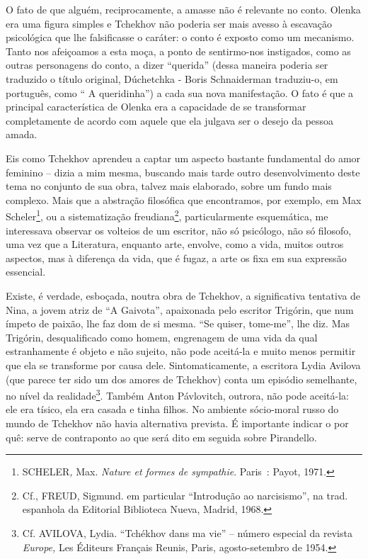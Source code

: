 O fato de que alguém, reciprocamente, a amasse não é relevante no conto.
Olenka era uma figura simples e Tchekhov não poderia ser mais avesso à
escavação psicológica que lhe falsificasse o caráter: o conto é exposto
como um mecanismo. Tanto nos afeiçoamos a esta moça, a ponto de
sentirmo-nos instigados, como as outras personagens do conto, a dizer
``querida'' (dessa maneira poderia ser traduzido o título original,
Dúchetchka - Boris Schnaiderman traduziu-o, em português, como `` A
queridinha'') a cada sua nova manifestação. O fato é que a principal
característica de Olenka era a capacidade de se transformar
completamente de acordo com aquele que ela julgava ser o desejo da
pessoa amada.

Eis como Tchekhov aprendeu a captar um aspecto bastante fundamental do
amor feminino -- dizia a mim mesma, buscando mais tarde outro
desenvolvimento deste tema no conjunto de sua obra, talvez mais
elaborado, sobre um fundo mais complexo. Mais que a abstração filosófica
que encontramos, por exemplo, em Max Scheler\footnote{SCHELER\emph{,}
  Max. \emph{Nature et formes de sympathie}. Paris~: Payot, 1971.}, ou a
sistematização freudiana\footnote{Cf., FREUD, Sigmund. em particular
  ``Introdução ao narcisismo'', na trad. espanhola da Editorial
  Biblioteca Nueva, Madrid, 1968.}, particularmente esquemática, me
interessava observar os volteios de um escritor, não só psicólogo, não
só filosofo, uma vez que a Literatura, enquanto arte, envolve, como a
vida, muitos outros aspectos, mas à diferença da vida, que é fugaz, a
arte os fixa em sua expressão essencial.

Existe, é verdade, esboçada, noutra obra de Tchekhov, a significativa
tentativa de Nina, a jovem atriz de ``A Gaivota'', apaixonada pelo
escritor Trigórin, que num ímpeto de paixão, lhe faz dom de si mesma.
``Se quiser, tome-me'', lhe diz. Mas Trigórin, desqualificado como
homem, engrenagem de uma vida da qual estranhamente é objeto e não
sujeito, não pode aceitá-la e muito menos permitir que ela se transforme
por causa dele. Sintomaticamente, a escritora Lydia Avilova (que parece
ter sido um dos amores de Tchekhov) conta um episódio semelhante, no
nível da realidade\footnote{Cf. AVILOVA, Lydia. ``Tchékhov dans ma vie''
  -- número especial da revista \emph{Europe,} Les Éditeurs Français
  Reunis, Paris, agosto-setembro de 1954.}. Também Anton Pávlovitch,
outrora, não pode aceitá-la: ele era tísico, ela era casada e tinha
filhos. No ambiente sócio-moral russo do mundo de Tchekhov não havia
alternativa prevista. É importante indicar o por quê: serve de
contraponto ao que será dito em seguida sobre Pirandello.

